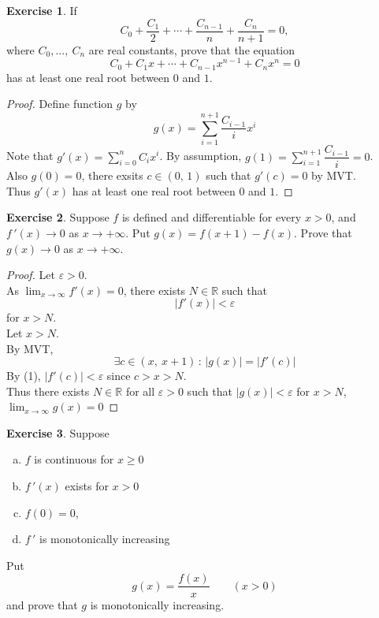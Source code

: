 \documentclass[12pt]{book}
\theoremstyle{definition}
\newtheorem{exercise}{Exercise}
\newcommand{\R}{\mathbb{R}}
\begin{document}
	\newpage
	\begin{exercise}
		If
		\begin{equation*}
			C_0+\dfrac{C_1}{2}+\cdots+\dfrac{C_{n-1}}{n}+\dfrac{C_n}{n+1}=0,
		\end{equation*}
		where $C_0,...,\ C_n$ are real constants, prove that the equation
		\begin{equation*}
			C_0+C_1x+\cdots+C_{n-1}x^{n-1}+C_nx^n=0
		\end{equation*}
		has at least one real root between $0$ and $1$.
	\end{exercise}
	\begin{proof}
		Define function $g$ by
		\begin{equation*}
			g(x)=\displaystyle\sum_{i=1}^{n+1}\dfrac{C_{i-1}}{i}x^i
		\end{equation*}
		Note that $g'(x)=\displaystyle\sum_{i=0}^n C_i x^i$.
		By assumption, $g(1)=\displaystyle\sum_{i=1}^{n+1}\dfrac{C_{i-1}}{i}=0$.\\
		Also $g(0)=0$, there exsits $c\in(0,\,1)$ such that $g'(c)=0$ by MVT.\\
		Thus $g'(x)$ has at least one real root between $0$ and $1$.
	\end{proof}
	\newpage
	\begin{exercise}
		Suppose $f$ is defined and differentiable for every $x>0$, and $f\,'(x)\rightarrow 0$ as $x\rightarrow +\infty$. Put $g(x)=f(x+1)-f(x)$. Prove that $g(x)\rightarrow 0$ as $x\rightarrow+\infty$.
	\end{exercise}
	\begin{proof}
		Let $\varepsilon>0$.\\
		As $\displaystyle\lim_{x\rightarrow\infty} f'(x)=0$, there exists $N\in\R$ such that 
		\begin{equation}
			|f'(x)|<\varepsilon
		\end{equation} for $x>N$.\\
		Let $x>N$.\\
		By MVT,
		\begin{equation*}
			\exists c\in(x,\ x+1)\,:\,|g(x)|=|f'(c)|
		\end{equation*}
		By (1), $|f'(c)|<\varepsilon$ since $c>x>N$.\\
		Thus there exists $N\in\R$ for all $\varepsilon>0$ such that $|g(x)|<\varepsilon$ for $x>N$, $\displaystyle\lim_{x\rightarrow\infty}g(x)=0$
	\end{proof}
	\newpage
	\begin{exercise}
		Suppose
		\begin{enumerate}[(a)]
			\item $f$ is continuous for $x\geq0$
			\item $f\,'(x)$ exists for $x>0$
			\item $f(0)=0$,
			\item $f\,'$ is monotonically increasing
		\end{enumerate}
		Put
		\begin{equation*}
			g(x)=\dfrac{f(x)}{x}\qquad (x>0)
		\end{equation*}
		and prove that $g$ is monotonically increasing.
	\end{exercise}
\end{document}
